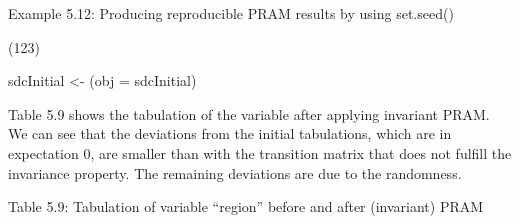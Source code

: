 \documentclass[letterpaper,10pt,english]{sphinxmanual}
\begin{document}
Example 5.12: Producing reproducible PRAM results by using set.seed()

\begin{DUlineblock}{0em}
\item[] 
\item[] (123)
\item[] 
\item[] sdcInitial \textless{}- (obj = sdcInitial)
\end{DUlineblock}

\begin{DUlineblock}{0em}
\item[] 
\item[] \sphinxcode{\sphinxupquote{\#\# - - - - - - - - - - -}}
\item[] 
\item[] 
\item[] 
\item[] 
\item[] 
\item[] 
\item[] 
\item[] 
\item[] 
\end{DUlineblock}

Table 5.9 shows the tabulation of the variable after applying invariant
PRAM. We can see that the deviations from the initial tabulations, which
are in expectation 0, are smaller than with the transition matrix that
does not fulfill the invariance property. The remaining deviations are
due to the randomness.

Table 5.9: Tabulation of variable “region” before and after (invariant)
PRAM
\end{document}
